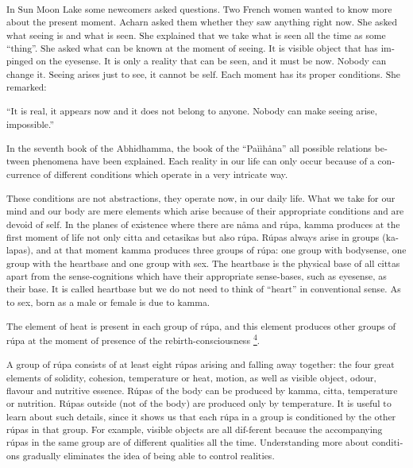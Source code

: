 \textsuperscript{\textdutch{In Sun Moon Lake some newcomers asked
questions. Two French women wanted to know more about the present
moment. Acharn asked them whether they saw anything right now. She asked
what seeing is and what is seen. She explained that we take what is seen
all the time as some ``thing''. She asked what can be known at the
moment of seeing. It is visible object that has impinged on the
eyesense. It is only a reality that can be seen, and it must be now.
Nobody can change it. Seeing arises just to see, it cannot be self. Each
moment has its proper conditions. She remarked:}}

\textsuperscript{``\textdutch{It is real, it appears now and it does not
belong to anyone. Nobody can make seeing arise, impossible.''}}

\textsuperscript{\textdutch{In the seventh book of the Abhidhamma, the
book of the }``Pa\textdutch{ììhå}na''\textdutch{
}\textenglish[variant=american]{all possible relations between
phenomena}\textdutch{ have been
explained}\textenglish[variant=american]{. Each reality in our life can
only occur because of a concurrence of different conditions which
operate in a very intricate way. }}

\textsuperscript{\textenglish[variant=american]{These conditions are not
abstractions, they operate now, in our daily life. What we take for our
mind and our body are mere elements which arise because of their
appropriate conditions and are devoid of self. }\textdutch{In the planes
of existence where there are nåma and rúpa, kamma produces at the first
moment of life not only citta and cetasikas but also rúpa. Rúpas always
arise in groups (kalapas), and at that moment kamma produces three
groups of rúpa: one group with bodysense, one group with the heartbase
and one group with sex. The heartbase is the physical base of all cittas
apart from the sense-cognitions which have their appropriate
sense-bases, such as eyesense, as their base. It is called heartbase but
we do not need to think of ``heart'' in conventional sense. As to sex,
born as a male or female is due to kamma. }}

\textsuperscript{\textdutch{The element of heat is present in each group
of rúpa, and this element produces other groups of rúpa at the moment of
presence of the rebirth-consciousness
\protect\hyperlink{sdfootnote4sym}{\textsuperscript{4}}. }}

\textsuperscript{\textdutch{A group of rúpa consists of at least eight
rúpas arising and falling away together: the four great elements of
solidity, cohesion, temperature or heat, motion, as well as visible
object, odour, flavour and nutritive essence. Rúpas of the body can be
produced by kamma, citta, temperature or nutrition. Rúpas outside (not
of the body) are produced only by temperature. It is useful to learn
about such details, since it shows us that each rúpa in a group is
conditioned by the other rúpas in that group. For example, visible
objects are all dif-ferent because the accompanying rúpas in the same
group are of different qualities all the time. Understanding more about
conditions gradually eliminates the idea of being able to control
realities. }}

